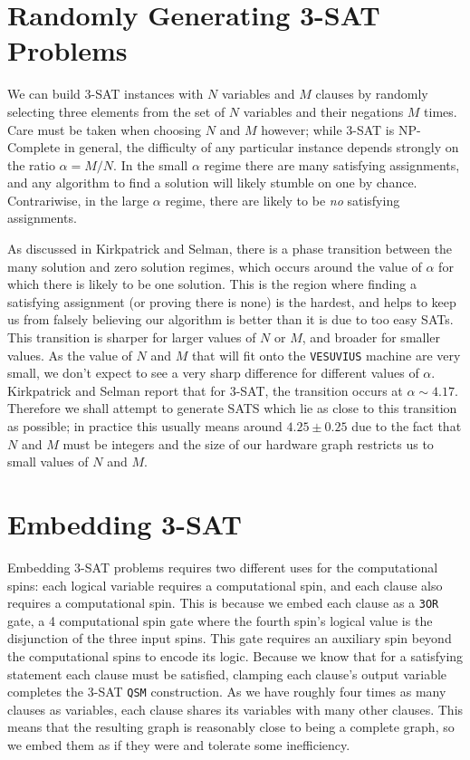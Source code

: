 \section{Randomly Generating 3-SAT Problems}
We can build 3-SAT instances with $N$ variables and $M$ clauses by randomly selecting three elements from the set of $N$ variables and their negations $M$ times.  Care must be taken when choosing $N$ and $M$ however; while 3-SAT is NP-Complete in general, the difficulty of any particular instance depends strongly on the ratio $\alpha = M/N$\cite{Kirkpatrick}.  In the small $\alpha$ regime there are many satisfying assignments, and any algorithm to find a solution will likely stumble on one by chance.  Contrariwise, in the large $\alpha$ regime, there are likely to be \emph{no} satisfying assignments.

As discussed in Kirkpatrick and Selman\cite{Kirkpatrick}, there is a phase transition between the many solution and zero solution regimes, which occurs around the value of $\alpha$ for which there is likely to be one solution.  This is the region where finding a satisfying assignment (or proving there is none) is the hardest, and helps to keep us from falsely believing our algorithm is better than it is due to too easy SATs.  This transition is sharper for larger values of $N$ or $M$, and broader for smaller values.  As the value of $N$ and $M$ that will fit onto the \texttt{VESUVIUS} machine are very small, we don't expect to see a very sharp difference for different values of $\alpha$.  Kirkpatrick and Selman report that for 3-SAT, the transition occurs at $\alpha \sim 4.17$.  Therefore we shall attempt to generate SATS which lie as close to this transition as possible; in practice this usually means around $4.25 \pm 0.25$ due to the fact that $N$ and $M$ must be integers and the size of our hardware graph restricts us to small values of $N$ and $M$.

\section{Embedding 3-SAT}
Embedding 3-SAT problems requires two different uses for the computational spins: each logical variable requires a computational spin, and each clause also requires a computational spin.  This is because we embed each clause as a \texttt{3OR} gate, a 4 computational spin gate where the fourth spin's logical value is the disjunction of the three input spins.  This gate requires an auxiliary spin beyond the computational spins to encode its logic.  Because we know that for a satisfying statement each clause must be satisfied, clamping each clause's output variable completes the 3-SAT \texttt{QSM} construction.  As we have roughly four times as many clauses as variables, each clause shares its variables with many other clauses.  This means that the resulting graph is reasonably close to being a complete graph, so we embed them as if they were and tolerate some inefficiency. 

